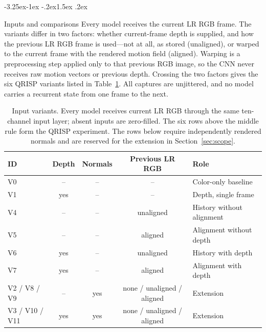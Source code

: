 \documentclass[11pt,a4paper]{article}
\makeatletter
\renewcommand\subsection{\@startsection{subsection}{2}{\z@}%
  {-3.25ex\@plus -1ex \@minus -.2ex}{1.5ex \@plus .2ex}%
  {\normalfont\large\bfseries\raggedright}}
\makeatother
\begin{document}
\subsection{Inputs and comparisons}
Every model receives the current LR RGB frame. The variants differ in
two factors: whether current-frame depth is supplied, and how the
previous LR RGB frame is used---not at all, as stored (unaligned), or
warped to the current frame with the rendered motion field (aligned).
Warping is a preprocessing step applied only to that previous RGB image,
so the CNN never receives raw motion vectors or previous depth.
Crossing the two factors gives the six QRISP variants listed in
Table~\ref{tab:variants}. All captures are unjittered, and no model
carries a recurrent state from one frame to the next.

\begin{table}[t]
\centering
\caption{Input variants. Every model receives current LR RGB through the
same ten-channel input layer; absent inputs are zero-filled. The six rows
above the middle rule form the QRISP experiment. The rows below require
independently rendered normals and are reserved for the extension in
Section~\ref{sec:scope}.}
\label{tab:variants}
\begin{tabular}{@{}lcccl@{}}
\hline
ID & Depth & Normals & Previous LR RGB & Role \\
\hline
V0 & --  & -- & --        & Color-only baseline \\
V1 & yes & -- & --        & Depth, single frame \\
V4 & --  & -- & unaligned & History without alignment \\
V5 & --  & -- & aligned   & Alignment without depth \\
V6 & yes & -- & unaligned & History with depth \\
V7 & yes & -- & aligned   & Alignment with depth \\
\hline
V2 / V8 / V9   & --  & yes & none / unaligned / aligned & Extension \\
V3 / V10 / V11 & yes & yes & none / unaligned / aligned & Extension \\
\hline
\end{tabular}
\end{table}
\end{document}
